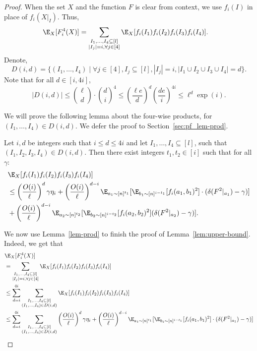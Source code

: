 \begin{proof}
When the set $X$ and the function $F$ is clear from context, we use $f_i(I)$ in place of $f_i(X|_I)$. Thus,
\begin{align*}
\E_X[F_i^4(X)] &= \sum_{\substack{ I_1,\ldots,I_4 \subseteq [l] \\ |I_j| = i, \forall j\in [4]}}\E_X[ f_i(I_1) f_i(I_2) f_i(I_3) f_i(I_4)].   
\end{align*}
Denote, $$D(i,d) = \{(I_1,\ldots,I_4) \mid \forall j \in [4], I_j \subseteq [l], |I_j| = i, |I_1 \cup I_2 \cup I_3 \cup I_4| = d\}.$$
Note that for all $d \in [i,4i]$,
\[|D(i,d)| \leq {\ell \choose d}\cdot {d \choose i}^4 \leq \left(\frac{\ell e}{d}\right)^d \left(\frac{de}{i} \right)^{4i} \leq \ell^d \exp(i).\]

We will prove the following lemma about the four-wise products, for $(I_1,\ldots,I_4) \in D(i,d)$. We defer
the proof to Section~\ref{sec:pf_lem-prod}.
\begin{lemma}\label{lem-prod}
Let $i,d$ be integers such that $i \leq d \leq 4i$ and let $I_1,\ldots,I_4 \subseteq [l]$, such that $(I_1,I_2,I_3,I_4) \in D(i,d)$. Then there exist integers $t_1,t_2 \in [i]$ such that for all $\gamma$:
\begin{align*}
&\E_X[f_i(I_1)f_i(I_2)f_i(I_3)f_i(I_4)] \\
&\leq \left(\frac{O(i)}{\ell}\right)^{d}\gamma\eta_i + \left(\frac{O(i)}{\ell}\right)^{d-i}\E_{a_1 \sim [n]^{t_1}}[\E_{b_1 \sim [n]^{i-t_1}}[f_i(a_1,b_1)^2]\cdot (\delta(F^{ 2}|_{a_1}) - \gamma)]  \\ 
&+ \left(\frac{O(i)}{\ell}\right)^{d-i}\E_{a_2 \sim [n]^{t_2}}[\E_{b_2 \sim [n]^{i-t_2}}[f_i(a_2,b_2)^2](\delta(F^{ 2}|_{a_2}) - \gamma)]. 
\end{align*}
\end{lemma}
We now use Lemma~\ref{lem-prod} to finish the proof of Lemma~\ref{lem:upper-bound}. Indeed, we get that
\begin{align*}
&\E_X[F_i^4(X)] \\
&= \sum_{\substack{ I_1,\ldots,I_4 \subseteq [l] \\ |I_j| = i, \forall j\in [4]}}\E_X[ f_i(I_1) f_i(I_2) f_i(I_3) f_i(I_4)] \\
&\leq \sum_{d = i}^{4i} \sum_{\substack{ I_1,\ldots,I_4 \subseteq [l] \\ (I_1,\ldots,I_4) \in D(i,d)}} \E_X[ f_i(I_1) f_i(I_2) f_i(I_3) f_i(I_4)] \\
&\leq \sum_{d = i}^{4i} \sum_{\substack{ I_1,\ldots,I_4 \subseteq [l] \\ (I_1,\ldots,I_4) \in D(i,d)}} \left(\frac{O(i)}{\ell}\right)^{d}\gamma\eta_i +  \left(\frac{O(i)}{\ell}\right)^{d-i}\E_{a_1 \sim [n]^{t_1}}[\E_{b_1 \sim [n]^{i-t_1}}[f_i(a_1,b_1)^2]\cdot (\delta(F^{ 2}|_{a_1}) - \gamma)]  \\ 

\end{align*}
\end{proof}
